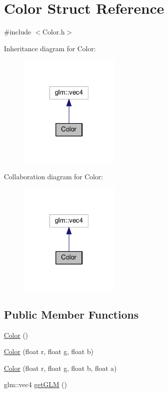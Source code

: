 \hypertarget{struct_color}{}\section{Color Struct Reference}
\label{struct_color}


{\ttfamily \#include $<$Color.\+h$>$}



Inheritance diagram for Color\+:
\nopagebreak
\begin{figure}[H]
\begin{center}
\leavevmode
\includegraphics[width=139pt]{struct_color__inherit__graph}
\end{center}
\end{figure}


Collaboration diagram for Color\+:
\nopagebreak
\begin{figure}[H]
\begin{center}
\leavevmode
\includegraphics[width=139pt]{struct_color__coll__graph}
\end{center}
\end{figure}
\subsection*{Public Member Functions}
\begin{DoxyCompactItemize}
\item 
\hyperlink{struct_color_a9a742cbe9f9f4037f5d9f4e81a9b2428}{Color} ()
\item 
\hyperlink{struct_color_a373c542c99fb83ce9c7c08aae76b2718}{Color} (float r, float g, float b)
\item 
\hyperlink{struct_color_a6e4627389673c8b5cce81bf3eec79938}{Color} (float r, float g, float b, float a)
\item 
glm\+::vec4 \hyperlink{struct_color_aac52dbc4a7b5b5f500171fa74be323f6}{get\+G\+LM} ()
\end{DoxyCompactItemize}


